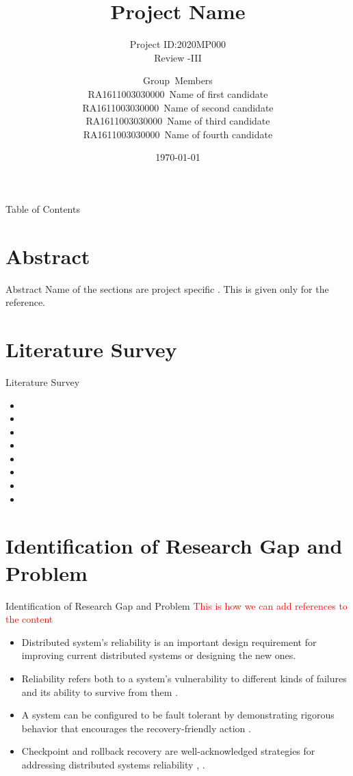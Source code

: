 \documentclass{beamer}
\title[2020MP000]{Project Name}
\subtitle{Project ID:2020MP000\\Review -III}
\author[SRM Institute of Science \& Technology]{Group~Members\\RA1611003030000~Name of first candidate\\RA1611003030000~Name of second candidate\\RA1611003030000~Name of third candidate\\RA1611003030000~Name of fourth candidate\\ \medskip{Supervised By:\\Dr. XXX \\}}
\institute[]{Department of Computer Science \& Engineering\\Faculty of Engineering \& Technology\\SRM Institute of Science \& Technology}
\date{\today}
\begin{document}
	\begin{frame}
		\maketitle
		\date{}
			\end{frame}
	\begin{frame}[allowframebreaks]{Table of Contents} %
		\tableofcontents[sections={1-6}]
		\framebreak
		\tableofcontents[sections={7-10}]
	\end{frame}
	\section{Abstract}
	\begin{frame}{Abstract}
		\LARGE
	Name of the sections are project specific . This is given only for the reference.
	\end{frame}
	\section{Literature Survey}
	\begin{frame}{Literature Survey}
	\begin{itemize}
		
		\item 
		\item
		\item 
		\item 
		\item 
		\item
		\item 
		\item 
		\end{itemize} 
	\end{frame}
\section{Identification of Research Gap and Problem}
\begin{frame}[t]{Identification of Research Gap and Problem}
	\LARGE
	\textcolor{red}{This is how we can add references to the content}
	\bigskip
	\normalsize
	\begin{itemize}
		\item Distributed system’s reliability is	an important design requirement for improving current distributed systems or designing the new ones. 
		\medskip
		\item Reliability	refers both to a system’s vulnerability to different kinds of failures and its ability to survive from them \cite{ozsu2011principles}.
		\medskip
		\item A system can be configured to be fault tolerant by demonstrating rigorous behavior that encourages the recovery-friendly action \cite{jandl2005increasing}.
		\medskip
		\item Checkpoint and rollback recovery are well-acknowledged strategies for addressing distributed systems reliability \cite{manivannan2002asynchronous}, \cite{manivannan1999quasi}.
	\end{itemize}
\end{frame}
\end{document}
